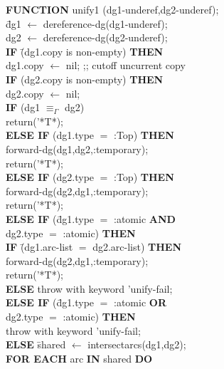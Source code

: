 \begin{footnotesize}
\begin{tabbing}
{\bf FUNCTION} unify1 (dg1-underef,dg2-underef); \\
\hspace*{2mm} \= dg1 $\leftarrow$ dereference-dg(dg1-underef); \\
 \> dg2 $\leftarrow$ dereference-dg(dg2-underef); \\
 \> {\bf IF} \= (dg1.copy is non-empty) {\bf THEN}  \\
 \>          \> dg1.copy $\leftarrow$ nil;  ;; cutoff uncurrent copy
\\
 \> {\bf IF} \> (dg2.copy is non-empty) {\bf THEN}  \\
 \>          \> dg2.copy $\leftarrow$ nil;  \\
 \> {\bf IF} \> (dg1 $\equiv_{\Gamma}$ dg2)  \\
 \>          \> return('*T*);       \\
 \> {\bf ELSE IF} (dg1.type $=$ :Top)  {\bf THEN} \\
 \>  \> forward-dg(dg1,dg2,:temporary); \\
 \> \>  return('*T*); \\
 \> {\bf ELSE IF} (dg2.type $=$ :Top)  {\bf THEN} \\
 \>  \> forward-dg(dg2,dg1,:temporary); \\
 \>  \> return('*T*); \\
 \> {\bf ELSE IF}  (\= dg1.type $=$ :atomic {\bf AND}  \\
 \>               \> dg2.type $=$ :atomic)  {\bf THEN} \\
 \> \hspace*{15mm} \= {\bf IF} \= (dg1.arc-list $=$
    dg2.arc-list)\footnotemark
                                          {\bf THEN} \\
 \>                \>          \> forward-dg(dg2,dg1,:temporary); \\
 \>                \>          \>  return('*T*); \\
 \>                 \> {\bf ELSE} throw\footnotemark
                        with keyword 'unify-fail;  \\
 \> {\bf ELSE IF} (\= dg1.type $=$ :atomic {\bf OR} \\
 \>               \>  dg2.type $=$ :atomic)    {\bf THEN} \\
 \>               \> throw with keyword 'unify-fail; \\
 \> {\bf ELSE}    \= shared $\leftarrow$ intersectarcs(dg1,dg2); \\
 \> \hspace*{6mm} \= {\bf FOR EACH} arc {\bf IN} shared {\bf DO} \\

\end{tabbing}
\end{footnotesize}
